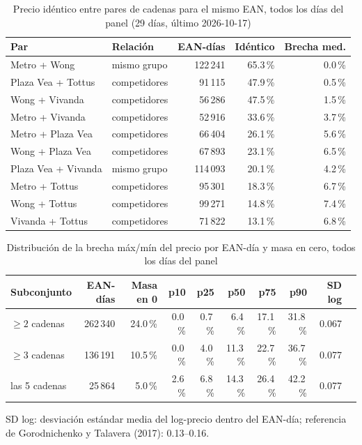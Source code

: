 
\begin{table}[htbp]
\caption{Precio id\'entico entre pares de cadenas para el mismo EAN, todos los d\'ias del panel (29 d\'ias, \'ultimo 2026-10-17)}
\label{tab:identidad}
\centering\scriptsize\setlength{\tabcolsep}{3pt}
\begin{tabular}{@{}llrrr@{}}
\toprule
Par & Relaci\'on & EAN-d\'ias & Id\'entico & Brecha med. \\
\midrule
Metro + Wong & mismo grupo & 122\,241 & 65.3\,\% & 0.0\,\% \\
Plaza Vea + Tottus & competidores & 91\,115 & 47.9\,\% & 0.5\,\% \\
Wong + Vivanda & competidores & 56\,286 & 47.5\,\% & 1.5\,\% \\
Metro + Vivanda & competidores & 52\,916 & 33.6\,\% & 3.7\,\% \\
Metro + Plaza Vea & competidores & 66\,404 & 26.1\,\% & 5.6\,\% \\
Wong + Plaza Vea & competidores & 67\,893 & 23.1\,\% & 6.5\,\% \\
Plaza Vea + Vivanda & mismo grupo & 114\,093 & 20.1\,\% & 4.2\,\% \\
Metro + Tottus & competidores & 95\,301 & 18.3\,\% & 6.7\,\% \\
Wong + Tottus & competidores & 99\,271 & 14.8\,\% & 7.4\,\% \\
Vivanda + Tottus & competidores & 71\,822 & 13.1\,\% & 6.8\,\% \\
\bottomrule\end{tabular}\end{table}

\begin{table}[t]
\caption{Distribuci\'on de la brecha m\'ax/m\'in del precio por EAN-d\'ia y masa en cero, todos los d\'ias del panel}
\label{tab:brecha}
\centering\scriptsize\setlength{\tabcolsep}{4pt}
\begin{tabular}{@{}lrrrrrrrrr@{}}
\toprule
Subconjunto & EAN-d\'ias & Masa en 0 & p10 & p25 & p50 & p75 & p90 & SD log \\
\midrule
$\geq 2$ cadenas & 262\,340 & 24.0\,\% & 0.0\,\% & 0.7\,\% & 6.4\,\% & 17.1\,\% & 31.8\,\% & 0.067 \\
$\geq 3$ cadenas & 136\,191 & 10.5\,\% & 0.0\,\% & 4.0\,\% & 11.3\,\% & 22.7\,\% & 36.7\,\% & 0.077 \\
las 5 cadenas & 25\,864 & 5.0\,\% & 2.6\,\% & 6.8\,\% & 14.3\,\% & 26.4\,\% & 42.2\,\% & 0.077 \\
\bottomrule\end{tabular}
\par\smallskip\raggedright\scriptsize SD log: desviaci\'on est\'andar media del log-precio dentro del EAN-d\'ia; referencia de Gorodnichenko y Talavera (2017): 0.13--0.16.
\end{table}

